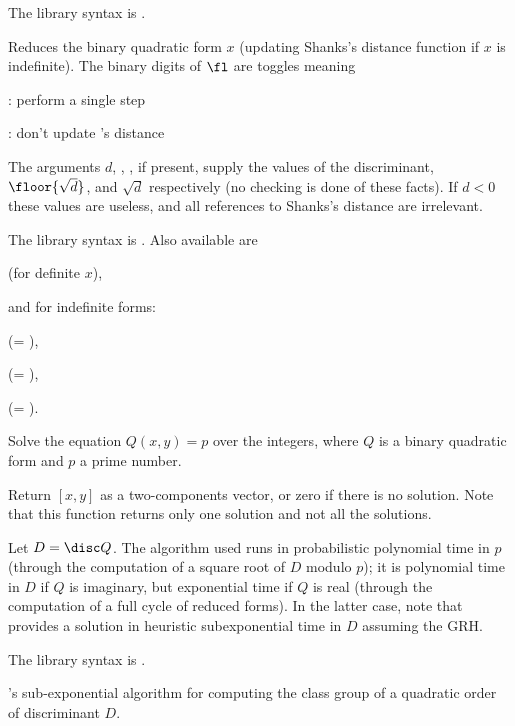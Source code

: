 The library syntax is .

\label{se:qfbred}
Reduces the binary quadratic form $x$ (updating Shanks's distance function
if $x$ is indefinite). The binary digits of $\fl$ are toggles meaning

: perform a single  step

: don't update 's distance

The arguments $d$, , , if present, supply the values of the
discriminant, $\floor{\sqrt{d}}$, and $\sqrt{d}$ respectively
(no checking is done of these facts). If $d<0$ these values are useless,
and all references to Shanks's distance are irrelevant.

The library syntax is .
Also available are

 (for definite $x$),

\noindent and for indefinite forms:


 (= ),

 (= ),

 (= ).

\label{se:qfbsolve}
Solve the equation $Q(x,y)=p$ over the integers,
where $Q$ is a binary quadratic form and $p$ a prime number.

Return $[x,y]$ as a two-components vector, or zero if there is no solution.
Note that this function returns only one solution and not all the solutions.

Let $D = \disc Q$. The algorithm used runs in probabilistic polynomial time
in $p$ (through the computation of a square root of $D$ modulo $p$); it is
polynomial time in $D$ if $Q$ is imaginary, but exponential time if $Q$ is
real (through the computation of a full cycle of reduced forms). In the
latter case, note that  provides a solution in heuristic
subexponential time in $D$ assuming the GRH.

The library syntax is .

\label{se:quadclassunit}
's sub-exponential algorithm for computing the
class group of a quadratic order of discriminant $D$.

